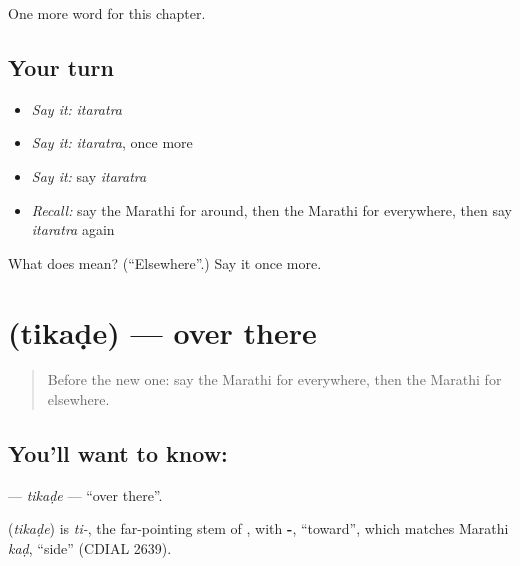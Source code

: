 \begin{grammarlens}[title={What you've built}]
One more word for this chapter.
\end{grammarlens}

\subsection*{Your turn}
\begin{itemize}
\raggedright
  \item \emph{Say it:} \emph{itaratra}
  \item \emph{Say it:} \emph{itaratra}, once more
  \item \emph{Say it:} say \emph{itaratra}
  \item \emph{Recall:} say the Marathi for around, then the Marathi for everywhere, then say \emph{itaratra} again
\end{itemize}

\begin{tcolorbox}[breakable,colback=teal!4,colframe=teal!35!black,title={Before you move on}]
What does  mean? (\textquotedblleft{}Elsewhere\textquotedblright{}.) Say it once more.
\end{tcolorbox}
\section[\texorpdfstring{\mr{तिकडे} (tikaḍe)}{तिकडे (tikaḍe)}]{ (tikaḍe) — over there}

\label{lesson:MR-C172-tikade}



\begin{quote}
Before the new one: say the Marathi for everywhere, then the Marathi for elsewhere.
\end{quote}

\subsection*{You'll want to know: }
\textbf{} — \emph{tikaḍe} — \textquotedblleft{}over there\textquotedblright{}.

\begin{cousinweb}
\textbf{} (\emph{tikaḍe}) is \emph{ti-}, the far-pointing stem of \textbf{}, with \textbf{-}, \textquotedblleft{}toward\textquotedblright{}, which matches Marathi \emph{kaḍ}, \textquotedblleft{}side\textquotedblright{} (CDIAL 2639).
\end{cousinweb}

